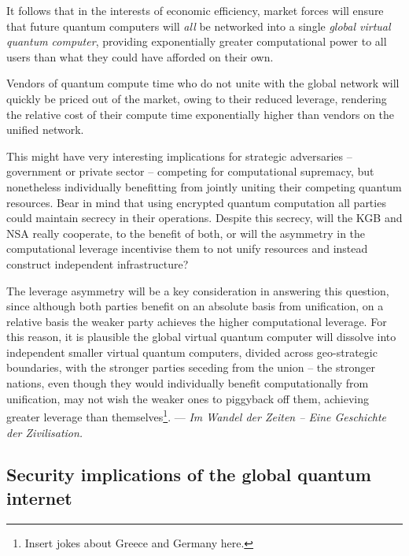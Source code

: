 \documentclass[aps, rmp, twocolumn, amsmath, amssymb, nofootinbib, superscriptaddress, longbibliography, floatfix, table-of-contents, eqsecnum]{revtex4-1}
\newcommand{\comment}[1]{{\color{blue}{\textbf{#1}}}}
\begin{document}
It follows that in the interests of economic efficiency, market forces will ensure that future quantum computers will \textit{all} be networked into a single \textit{global virtual quantum computer}, providing exponentially greater computational power to all users than what they could have afforded on their own.

Vendors of quantum compute time who do not unite with the global network will quickly be priced out of the market, owing to their reduced leverage, rendering the relative cost of their compute time exponentially \comment{Is the relative cost exponential?} higher than vendors on the unified network.

This might have very interesting implications for strategic adversaries -- government or private sector -- competing for computational supremacy, but nonetheless individually benefitting from jointly uniting their competing quantum resources. Bear in mind that using encrypted quantum computation all parties could maintain secrecy in their operations. Despite this secrecy, will the KGB and NSA really cooperate, to the benefit of both, or will the asymmetry in the computational leverage incentivise them to not unify resources and instead construct independent infrastructure?

The leverage asymmetry will be a key consideration in answering this question, since although both parties benefit on an absolute basis from unification, on a relative basis the weaker party achieves the higher computational leverage. For this reason, it is plausible the global virtual quantum computer will dissolve into independent smaller virtual quantum computers, divided across geo-strategic boundaries, with the stronger parties seceding from the union -- the stronger nations, even though they would individually benefit computationally from unification, may not wish the weaker ones to piggyback off them, achieving greater leverage than themselves\footnote{Insert jokes about Greece and Germany here.}. --- \textit{Im Wandel der Zeiten -- Eine Geschichte der Zivilisation.}

%
%

\subsection{Security implications of the global quantum internet} \label{sec:sec_imp} 
\end{document}
